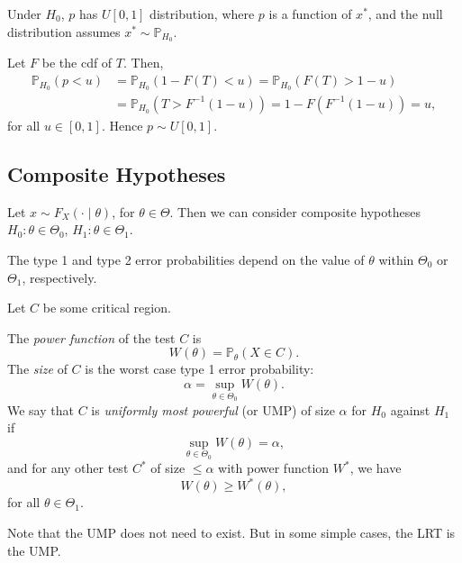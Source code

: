 \documentclass[12pt]{article}
\begin{document}
\begin{proposition}
	Under $H_0$, $p$ has $U[0, 1]$ distribution, where $p$ is a function of $x^{\ast}$, and the null distribution assumes $x^{\ast} \sim \mathbb{P}_{H_0}$.
\end{proposition}

\begin{proofbox}
	Let $F$ be the cdf of $T$. Then,
	\begin{align*}
		\mathbb{P}_{H_0}(p < u) &= \mathbb{P}_{H_0}(1 - F(T) < u) = \mathbb{P}_{H_0}(F(T) > 1-u) \\
					&= \mathbb{P}_{H_0}(T > F^{-1}(1-u)) = 1 - F(F^{-1}(1-u)) = u,
	\end{align*}
	for all $u \in [0, 1]$. Hence $p \sim U[0,1]$.
\end{proofbox}

\subsection{Composite Hypotheses}
\label{sub:composite_hypotheses}

Let $x \sim F_X(\cdot \mid \theta)$, for $\theta \in \Theta$. Then we can consider composite hypotheses $H_0 : \theta \in \Theta_0$, $H_1 : \theta \in \Theta_1$.

The type 1 and type 2 error probabilities depend on the value of $\theta$ within $\Theta_0$ or $\Theta_1$, respectively.

Let $C$ be some critical region.

\begin{definition}
	The \emph{power function} of the test $C$ is
	\[
	W(\theta) = \mathbb{P}_{\theta}(X \in C)
	.\]
	The \emph{size} of $C$ is the worst case type 1 error probability:
	\[
	\alpha = \sup_{\theta \in \Theta_0} W(\theta)
	.\]
	We say that $C$ is \emph{uniformly most powerful} (or UMP) of size $\alpha$ for $H_0$ against $H_1$ if
	\[
	\sup_{\theta \in \Theta_0} W(\theta) = \alpha
	,\]
	and for any other test $C^{\ast}$ of size $\leq \alpha$ with power function $W^{\ast}$, we have
	\[
	W(\theta) \geq W^{\ast}(\theta)
	,\]
	for all $\theta \in \Theta_1$.
\end{definition}

Note that the UMP does not need to exist. But in some simple cases, the LRT is the UMP.
\end{document}
